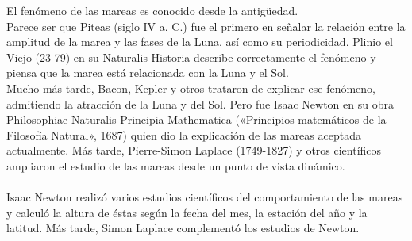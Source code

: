 \documentclass[12pt]{article}
\begin{document}
\begin{large}
El fenómeno de las mareas es conocido desde la antigüedad.\\Parece ser que Piteas (siglo IV a. C.) fue el primero en señalar la relación entre la amplitud de la marea y las fases de la Luna, así como su periodicidad. Plinio el Viejo (23-79) en su Naturalis Historia describe correctamente el fenómeno y piensa que la marea está relacionada con la Luna y el Sol. \\Mucho más tarde, Bacon, Kepler y otros trataron de explicar ese fenómeno, admitiendo la atracción de la Luna y del Sol. Pero fue Isaac Newton en su obra Philosophiae Naturalis Principia Mathematica («Principios matemáticos de la Filosofía Natural», 1687) quien dio la explicación de las mareas aceptada actualmente. Más tarde, Pierre-Simon Laplace (1749-1827) y otros científicos ampliaron el estudio de las mareas desde un punto de vista dinámico.\\
\\
Isaac Newton realizó varios estudios científicos del comportamiento de las mareas y calculó la altura de éstas según la fecha del mes, la estación del año y la latitud. Más tarde, Simon Laplace complementó los estudios de Newton.
\end{large} 
 
\end{document}
